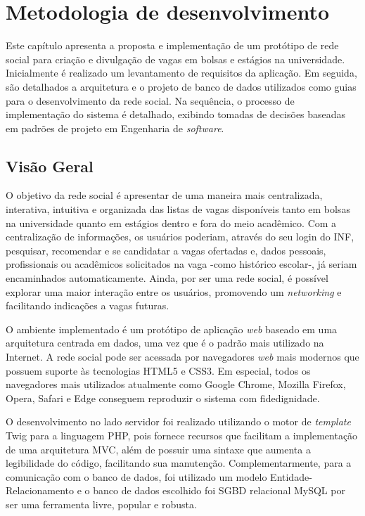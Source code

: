 \chapter{Metodologia de desenvolvimento}
\label{metodologiaDesenvolvimento}
Este capítulo apresenta a proposta e implementação de um protótipo de rede social para criação e divulgação de vagas em bolsas e estágios na universidade. Inicialmente é realizado um levantamento de requisitos da aplicação. Em seguida, são detalhados a arquitetura e o projeto de banco de dados utilizados como guias para o desenvolvimento da rede social. Na sequência, o processo de implementação do sistema é detalhado, exibindo tomadas de decisões baseadas em padrões de projeto em Engenharia de \textit{software}.

\section{Visão Geral}
\label{metodologiaVisaoGeral}
O objetivo da rede social é apresentar de uma maneira mais centralizada, interativa, intuitiva e organizada das listas de vagas disponíveis tanto em bolsas na universidade quanto em estágios dentro e fora do meio acadêmico. Com a centralização de informações, os usuários poderiam, através do seu login do INF, pesquisar, recomendar e se candidatar a vagas ofertadas e, dados pessoais, profissionais ou acadêmicos solicitados na vaga -como histórico escolar-, já seriam encaminhados automaticamente. Ainda, por ser uma rede social, é possível explorar uma maior interação entre os usuários, promovendo um \textit{networking} e facilitando indicações a vagas futuras.

O ambiente implementado é um protótipo de aplicação \textit{web} baseado em uma arquitetura centrada em dados, uma vez que é o padrão mais utilizado na Internet. A rede social pode ser acessada por navegadores \textit{web} mais modernos que possuem suporte às tecnologias HTML5 e CSS3. Em especial, todos os navegadores mais utilizados atualmente como Google Chrome, Mozilla Firefox, Opera, Safari e Edge conseguem reproduzir o sistema com fidedignidade.

O desenvolvimento no lado servidor foi realizado utilizando o motor de \textit{template} Twig para a linguagem PHP, pois fornece recursos que facilitam a implementação de uma arquitetura MVC, além de possuir uma sintaxe que aumenta a legibilidade do código, facilitando sua manutenção. Complementarmente, para a comunicação com o banco de dados, foi utilizado um modelo Entidade-Relacionamento e o banco de dados escolhido foi SGBD relacional MySQL por ser uma ferramenta livre, popular e robusta.

